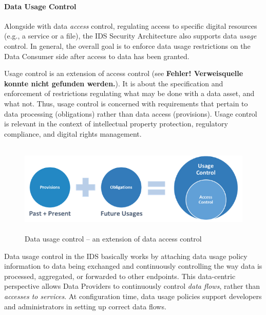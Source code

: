 \paragraph{Data Usage Control\\}

Alongside with data \textit{access} control, regulating access to specific digital resources (e.g., a service or a file), the IDS Security Architecture also supports data \textit{usage} control. In general, the overall goal is to enforce data usage restrictions on the Data Consumer side after access to data has been granted. 

Usage control is an extension of access control (see \textbf{Fehler! Verweisquelle konnte nicht gefunden werden.}). It is about the specification and enforcement of restrictions regulating what may be done with a data asset, and what not. Thus, usage control is concerned with requirements that pertain to data processing (obligations) rather than data access (provisions). Usage control is relevant in the context of intellectual property protection, regulatory compliance, and digital rights management.




\begin{figure}[H]
	\begin{Center}
		\includegraphics[width=5.68in,height=1.73in]{./media/image68.png}
		\caption{ Data usage control – an extension of data access control}
		\label{fig:_Data_usage_control__an_extension_of_data_access_control}
	\end{Center}
\end{figure}



Data usage control in the IDS basically works by attaching data usage policy information to data being exchanged and continuously controlling the way data is processed, aggregated, or forwarded to other endpoints. This data-centric perspective allows Data Providers to continuously control \textit{data flows}, rather than \textit{accesses to services}. At configuration time, data usage policies support developers and administrators in setting up correct data flows.

